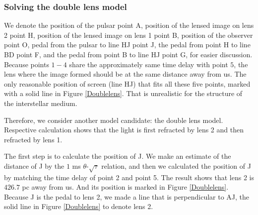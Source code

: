 \documentclass[useAMS,usenatbib]{mn2e}
\begin{document}
\subsubsection{Solving the double lens model}
We denote the position of the pulsar point A, position of the lensed image on lens 2 point H, position of the lensed image on lens 1 point B, position of the observer point O, pedal from the pulsar to line HJ point J, the pedal from point H to line BD point F, and the pedal from point B to line HJ point G, for easier discussion.
Because points $1-4$ share the approximately same time delay with point $5$, the lens where the image formed should be at the same distance away from us. The only reasonable position of screen (line HJ) that fits all these five points, marked with a solid line in Figure \ref{Doublelens}.  
That is unrealistic for the structure of the interstellar medium. 

Therefore, we consider another model candidate: the double lens model. Respective calculation shows that the light is first refracted by lens 2 and then refracted by lens 1. 

The first step is to calculate the position of J. We make an estimate of the distance of J by the $1$ ms $\theta$-$\sqrt{\tau}$ relation, and then we calculated the position of J by matching the time delay of point 2 and point 5. The result shows that lens 2 is $426.7$ pc away from us. And its position is marked in Figure \ref{Doublelens}. Because J is the pedal to lens 2, we made a line that is perpendicular to AJ, the solid line in Figure \ref{Doublelens} to denote lens 2.
\end{document}
